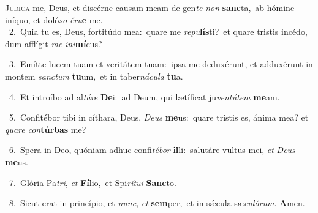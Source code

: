\lettrine{\initial\textcolor{\initialcolor}{J}}{údica} me, Deus, et discérne causam meam de gen\textit{te} \textit{non} \textbf{sanc}\-ta,~\star ab hómine iníquo, et doló\textit{so} \textit{é}\-\textit{ru}\textbf{e} me.\\
{\numbfont\textcolor{\numbcolor}{~2.}}~Quia tu es, Deus, fortitúdo mea:~\dagger quare me \textit{re}\-\textit{pu}\textbf{lís}ti?~\star et quare tristis incédo, dum afflígit \textit{me} \textit{in}\-\textit{i}\textbf{mí}cus?\par
{\numbfont\textcolor{\numbcolor}{~3.}}~Emítte lucem tuam et veritátem tuam:~\dagger ipsa me deduxérunt, et adduxérunt in montem \textit{sanc}\-\textit{tum} \textbf{tu}\-um,~\star et in taber\-\textit{ná}\-\textit{cu}\textit{la} \textbf{tu}\-a.\par
{\numbfont\textcolor{\numbcolor}{~4.}}~Et introíbo ad al\-\textit{tá}\-\textit{re} \textbf{De}\-i:~\star ad Deum, qui lætíficat ju\-\textit{ven}\-\textit{tú}\textit{tem} \textbf{me}\-am.\par
{\numbfont\textcolor{\numbcolor}{~5.}}~Confitébor tibi in cíthara, Deus, \textit{De}\-\textit{us} \textbf{me}\-us:~\star quare tristis es, ánima mea? et \textit{qua}\-\textit{re} \textit{con}\-\textbf{túr}\textbf{bas} me?\par
{\numbfont\textcolor{\numbcolor}{~6.}}~Spera in Deo, quóniam adhuc confi\-\textit{té}\-\textit{bor} \textbf{il}\-li:~\star salutáre vultus mei, \textit{et} \textit{De}\-\textit{us} \textbf{me}\-us.\par
{\numbfont\textcolor{\numbcolor}{~7.}}~Glória Pa\-\textit{tri}\-, \textit{et} \textbf{Fí}\-lio,~\star et Spi\-\textit{rí}\-\textit{tu}\textit{i} \textbf{Sanc}\-to.\par
{\numbfont\textcolor{\numbcolor}{~8.}}~Sicut erat in princípio, et \textit{nunc}\-, \textit{et} \textbf{sem}\-per,~\star et in sǽcula sæ\-\textit{cu}\-\textit{ló}\textit{rum}. \textbf{A}\-men.\par
